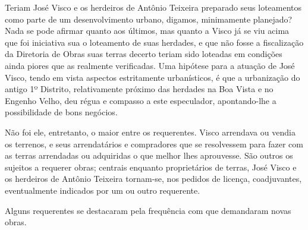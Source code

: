 Teriam José Visco e os herdeiros de Antônio Teixeira preparado seus loteamentos como parte de um desenvolvimento urbano, digamos, minimamente planejado? Nada se pode afirmar quanto aos últimos, mas quanto a Visco já se viu acima que foi iniciativa sua o loteamento de suas herdades, e que não fosse a fiscalização da Diretoria de Obras suas terras decerto teriam sido loteadas em condições ainda piores que as realmente verificadas. Uma hipótese para a atuação de José Visco, tendo em vista aspectos estritamente urbanísticos, é que a urbanização do antigo 1º Distrito, relativamente próximo das herdades na Boa Vista e no Engenho Velho, deu régua e compasso a este especulador, apontando-lhe a possibilidade de bons negócios.


Não foi ele, entretanto, o maior entre os requerentes. Visco arrendava ou vendia os terrenos, e seus arrendatários e compradores que se resolvessem para fazer com as terras arrendadas ou adquiridas o que melhor lhes aprouvesse. São outros os sujeitos a requerer obras; centrais enquanto proprietários de terras, José Visco e os herdeiros de Antônio Teixeira tornam-se, nos pedidos de licença, coadjuvantes, eventualmente indicados por um ou outro requerente.

Alguns requerentes se destacaram pela frequência com que demandaram novas obras.

